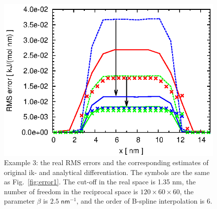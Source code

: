 \documentclass[aps,pre,preprint]{revtex4}
\begin{document}
\begin{figure}
  \centering
  \includegraphics[]{fig.new//fig.water.orig.error.eps}
  \caption{
    Example 3: the real RMS errors and the corresponding
    estimates of original ik- and analytical differentiation.
    The symbols are the same as Fig.~\ref{fig:error1}.
    The cut-off in the real space is 1.35 \textsf{nm}, the number of
    freedom in the reciprocal space is $120\times 60\times 60$, the
    parameter $\beta$ is $2.5\; \textsf{nm}^{-1}$, and the order of
    B-spline interpolation is 6.
  }   
  \label{fig:water-error0}
\end{figure}
\end{document}
